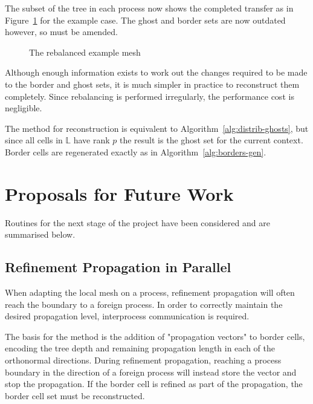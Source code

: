 \documentclass[twoside]{IIBproject}
\numberwithin{figure}{section}
\begin{document}
            The subset of the tree in each process now shows the completed transfer as in Figure~\ref{fig:rebalance-final} for the example case. The ghost and border sets are now outdated however, so must be amended.

            \begin{figure}[H]
                
                \caption{The rebalanced example mesh}
                \label{fig:rebalance-final}
            \end{figure}


            Although enough information exists to work out the changes required to be made to the border and ghost sets, it is much simpler in practice to reconstruct them completely. Since rebalancing is performed irregularly, the performance cost is negligible.

            The method for reconstruction is equivalent to Algorithm~\ref{alg:distrib-ghosts}, but since all cells in $\mathbb{L}$ have rank $p$ the result is the ghost set for the current context. Border cells are regenerated exactly as in Algorithm~\ref{alg:borders-gen}.





\section{Proposals for Future Work} %
    \label{sec:future-work}

    Routines for the next stage of the project have been considered and are summarised below. 

    \subsection{Refinement Propagation in Parallel} %
        \label{sec:parprop}

        When adapting the local mesh on a process, refinement propagation will often reach the boundary to a foreign process. In order to correctly maintain the desired propagation level, interprocess communication is required. 

        The basis for the method is the addition of "propagation vectors" to border cells, encoding the tree depth and remaining propagation length in each of the orthonormal directions. During refinement propagation, reaching a process boundary in the direction of a foreign process will instead store the vector and stop the propagation. If the border cell is refined as part of the propagation, the border cell set must be reconstructed. 
\end{document}
